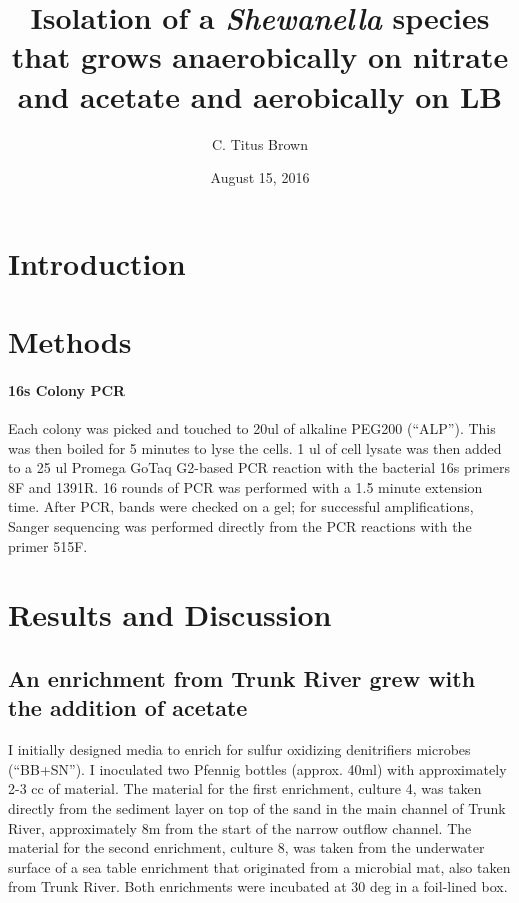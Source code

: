 \documentclass{article}
\begin{document}
\title{Isolation of a {\em Shewanella} species that grows
  anaerobically on nitrate and acetate and aerobically on LB}
\author{C. Titus Brown}
\date{August 15, 2016}

\maketitle

\section*{Introduction}

\section*{Methods}

\paragraph{16s Colony PCR} Each colony was picked and touched to 20ul of
alkaline PEG200 (``ALP'').  This was then boiled for 5 minutes to lyse
the cells. 1 ul of cell lysate was then added to a 25 ul Promega GoTaq
G2-based PCR reaction with the bacterial 16s primers 8F and 1391R.  16
rounds of PCR was performed with a 1.5 minute extension time.  After
PCR, bands were checked on a gel; for successful amplifications,
Sanger sequencing was performed directly from the PCR reactions with
the primer 515F.

\section*{Results and Discussion}

\subsection*{An enrichment from Trunk River grew with the addition of acetate}

I initially designed media to enrich for sulfur oxidizing denitrifiers
microbes (``BB+SN'').  I inoculated two Pfennig bottles (approx. 40ml)
with approximately 2-3 cc of material.  The material for the first
enrichment, culture 4, was taken directly from the sediment layer on
top of the sand in the main channel of Trunk River, approximately 8m
from the start of the narrow outflow channel. The material for the
second enrichment, culture 8, was taken from the underwater surface of
a sea table enrichment that originated from a microbial mat, also
taken from Trunk River.  Both enrichments were incubated at 30 deg
in a foil-lined box.
\end{document}

